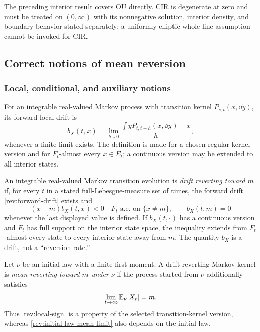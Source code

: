 \begin{remark}
The preceding interior result covers OU directly.  CIR is degenerate at zero
and must be treated on $(0,\infty)$ with its nonnegative solution, interior
density, and boundary behavior stated separately; a uniformly elliptic
whole-line assumption cannot be invoked for CIR.
\end{remark}

\subsection{Correct notions of mean reversion}

\subsubsection{Local, conditional, and auxiliary notions}

\begin{definition}
\label{rev:def-forward-drift}
For an integrable real-valued Markov process with transition kernel
$P_{s,t}(x,\dd y)$, its forward local drift is
\begin{equation}
b_X(t,x)=\lim_{h\downarrow0}
\frac{\int yP_{t,t+h}(x,\dd y)-x}{h},
\label{rev:forward-drift}
\end{equation}
whenever a finite limit exists.  The definition is made for a chosen regular
kernel version and for $F_t$-almost every $x\in E_t$; a continuous version may
be extended to all interior states.
\end{definition}

\begin{definition}
\label{rev:def-local-mr}
An integrable real-valued Markov transition evolution is \emph{drift
reverting toward $m$} if, for every $t$ in a stated full-Lebesgue-measure set
of times, the forward drift \eqref{rev:forward-drift} exists and
\begin{equation}
(x-m)b_X(t,x)<0
\quad F_t\text{-a.e. on }\{x\ne m\},
\qquad b_X(t,m)=0
\label{rev:local-sign}
\end{equation}
whenever the last displayed value is defined.  If $b_X(t,\cdot)$ has a
continuous version and $F_t$ has full support on the interior state space, the
inequality extends from $F_t$-almost every state to every interior state away
from $m$.  The quantity $b_X$ is a drift, not a ``reversion rate.''
\end{definition}

\begin{definition}
\label{rev:def-initial-law-mr}
Let $\nu$ be an initial law with a finite first moment.  A drift-reverting
Markov kernel is \emph{mean reverting toward $m$ under $\nu$} if the process
started from $\nu$ additionally satisfies
\begin{equation}
 \lim_{t\to\infty}\mathbb E_\nu[X_t]=m.
 \label{rev:initial-law-mean-limit}
\end{equation}
Thus \eqref{rev:local-sign} is a property of the selected transition-kernel
version, whereas \eqref{rev:initial-law-mean-limit} also depends on the
initial law.
\end{definition}

